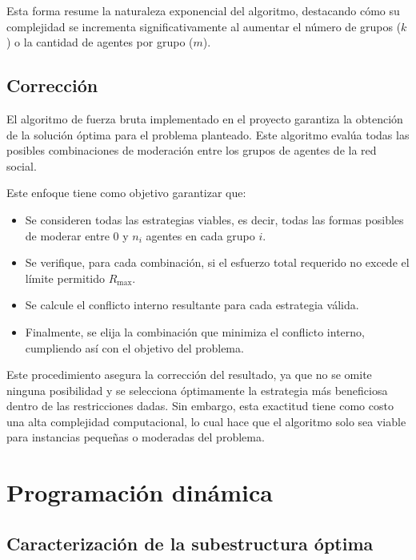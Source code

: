 Esta forma resume la naturaleza exponencial del algoritmo, destacando cómo su complejidad se incrementa significativamente al aumentar el número de grupos ($k$) o la cantidad de agentes por grupo ($m$).

\subsection{Corrección}

El algoritmo de fuerza bruta implementado en el proyecto garantiza la obtención de la solución óptima para el problema planteado. Este algoritmo evalúa todas las posibles combinaciones de moderación entre los grupos de agentes de la red social.

Este enfoque tiene como objetivo garantizar que:

\begin{itemize}
	\item Se consideren todas las estrategias viables, es decir, todas las formas posibles de moderar entre $0$ y $n_i$ agentes en cada grupo $i$.

	\item Se verifique, para cada combinación, si el esfuerzo total requerido no excede el límite permitido $R_{ \max }$.

	\item Se calcule el conflicto interno resultante para cada estrategia válida.

	\item Finalmente, se elija la combinación que minimiza el conflicto interno, cumpliendo así con el objetivo del problema.
\end{itemize}

Este procedimiento asegura la corrección del resultado, ya que no se omite ninguna posibilidad y se selecciona óptimamente la estrategia más beneficiosa dentro de las restricciones dadas. Sin embargo, esta exactitud tiene como costo una alta complejidad computacional, lo cual hace que el algoritmo solo sea viable para instancias pequeñas o moderadas del problema.

\section{Programación dinámica}

\subsection{Caracterización de la subestructura óptima}

